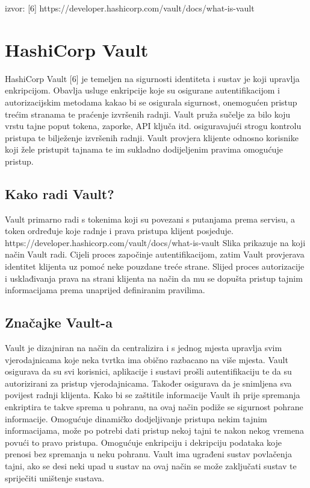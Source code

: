 \documentclass[]{foi}
\begin{document}
\cite{hashicorp-vault-what-is}
izvor: [6] https://developer.hashicorp.com/vault/docs/what-is-vault

\section{HashiCorp Vault }

HashiCorp Vault [6] je temeljen na sigurnosti identiteta i sustav je koji upravlja enkripcijom.
Obavlja usluge enkripcije koje su osigurane autentifikacijom i autorizacijskim metodama kakao bi se osigurala sigurnost, onemogućen pristup trećim stranama te praćenje izvršenih radnji.
Vault pruža sučelje za bilo koju vrstu tajne poput tokena, zaporke, API ključa itd. osiguravajući strogu kontrolu pristupa te bilježenje izvršenih radnji.
Vault provjera klijente odnosno korisnike koji žele pristupit tajnama te im sukladno dodijeljenim pravima omogućuje pristup.

\subsection{Kako radi Vault?}

Vault primarno radi s tokenima koji su povezani s putanjama prema servisu, a token ordređuje koje radnje i prava pristupa klijent posjeduje.
https://developer.hashicorp.com/vault/docs/what-is-vault
Slika prikazuje na koji način Vault radi.
Cijeli proces započinje autentifikacijom, zatim Vault provjerava identitet klijenta uz pomoć neke pouzdane treće strane.
Slijed proces autorizacije i usklađivanja prava na strani klijenta na način da mu se dopušta pristup tajnim informacijama prema unaprijed definiranim pravilima.

\subsection{Značajke Vault-a}

Vault je dizajniran na način da centralizira i s jednog mjesta upravlja svim vjerodajnicama koje neka tvrtka ima obično razbacano na više mjesta.
Vault osigurava da su svi korisnici, aplikacije i sustavi prošli autentifikaciju te da su autorizirani za pristup vjerodajnicama.
Također osigurava da je snimljena sva povijest radnji klijenta.
Kako bi se zaštitile informacije Vault ih prije spremanja enkriptira te takve sprema u pohranu, na ovaj način podiže se sigurnost pohrane informacije.
Omogućuje dinamičko dodjeljivanje pristupa nekim tajnim informacijama, može po potrebi dati pristup nekoj tajni te nakon nekog vremena povući to pravo pristupa.
Omogućuje enkripciju i dekripciju podataka koje prenosi bez spremanja u neku pohranu.
Vault ima ugrađeni sustav povlačenja tajni, ako se desi neki upad u sustav na ovaj način se može zaključati sustav te spriječiti uništenje sustava.
\end{document}
